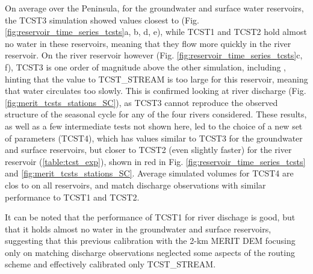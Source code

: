 On average over the Peninsula, for the groundwater and surface water reservoirs, the TCST3 simulation showed values closest to \std (Fig. \ref{fig:reservoir_time_series_tcsts}a, b, d, e), while TCST1 and TCST2 hold almost no water in these reservoirs, meaning that they flow more quickly in the river reservoir. On the river reservoir however (Fig. \ref{fig:reservoir_time_series_tcsts}c, f), TCST3 is one order of magnitude above the other simulation, including \std, hinting that the value to TCST\_STREAM is too large for this reservoir, meaning that water circulates too slowly. This is confirmed looking at river discharge (Fig. \ref{fig:merit_tcsts_stations_SC}), as TCST3 cannot reproduce the observed structure of the seasonal cycle for any of the four rivers considered. These results, as well as a few intermediate tests not shown here, led to the choice of a new set of parameters (TCST4), which has values similar to TCST3 for the groundwater and surface reservoirs, but closer to TCST2 (even slightly faster) for the river reservoir (\ref{table:tcst_exp}), shown in red in Fig. \ref{fig:reservoir_time_series_tcsts} and \ref{fig:merit_tcsts_stations_SC}.
Average simulated volumes for TCST4 are clos to \std on all reservoirs, and match discharge observations with similar performance to TCST1 and TCST2.

It can be noted that the performance of TCST1 for river dischage is good, but that it holds almost no water in the groundwater and surface reservoirs, suggesting that this previous calibration with the 2-km MERIT DEM focusing only on matching discharge observations \citep{kilic_evaluation_2023} neglected some aspects of the routing scheme and effectively calibrated only TCST\_STREAM.



